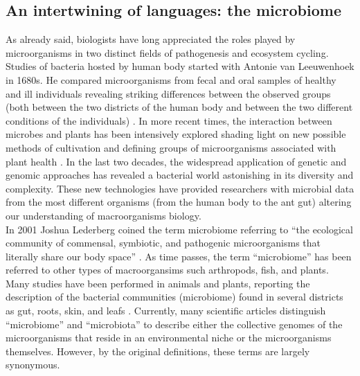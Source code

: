 \subsection{An intertwining of languages: the microbiome}
As already said, biologists have long appreciated the roles played by microorganisms in two distinct fields of pathogenesis and ecosystem cycling. Studies of bacteria hosted by human body started with Antonie van Leeuwenhoek in 1680s. He compared microorganisms from fecal and oral samples of healthy and ill individuals revealing striking differences between the observed groups (both between the two districts of the human body and between the two different conditions of the individuals) \cite{van1684abstract, dobell1920discovery}. In more recent times, the interaction between microbes and plants has been intensively explored shading light on new possible methods of cultivation and defining groups of microorganisms associated with plant health \cite{lundberg2012defining}. In the last two decades, the widespread application of genetic and genomic approaches has revealed a bacterial world astonishing in its diversity and complexity. These new technologies have provided researchers with microbial data from the most different organisms (from the human body to the ant gut) altering our understanding of macroorganisms biology.\\
In 2001 Joshua Lederberg coined the term microbiome referring to ``the ecological community of commensal, symbiotic, and pathogenic microorganisms that literally share our body space'' \cite{lederberg2001scientist}. As time passes, the term ``microbiome'' has been referred to other types of macroorgansims such arthropods, fish, and plants. Many studies have been performed in animals and plants, reporting the description of the bacterial communities (microbiome) found in several districts as gut, roots, skin, and leafs \cite{hyde2013living, stoll2007bacterial, ilmberger2014comparative, ringo2006characterisation, berlec2012novel}. Currently, many scientific articles distinguish ``microbiome'' and ``microbiota'' to describe either the collective genomes of the microorganisms that reside in an environmental niche or the microorganisms themselves. However, by the original definitions, these terms are largely synonymous.\\
